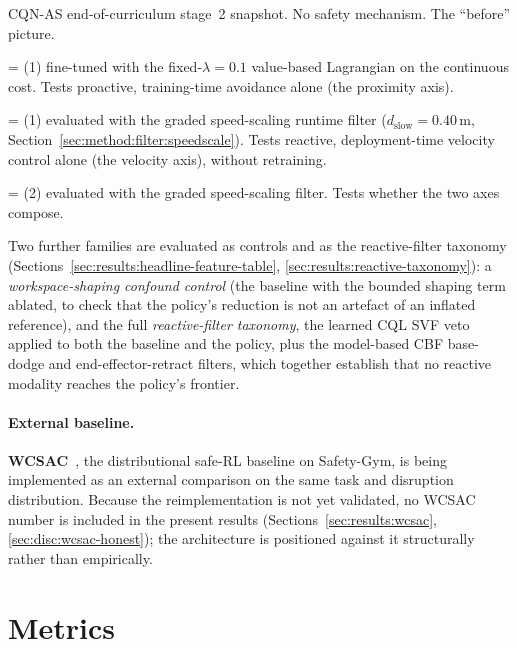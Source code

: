 \documentclass[11pt,a4paper]{report}
\newcommand{\cqnas}{CQN-AS}
\begin{document}
\begin{description}[leftmargin=2em,topsep=2pt,itemsep=1pt]
\item[(\textbf{1}) \emph{Unconstrained baseline}] \cqnas{}
  end-of-curriculum stage~2 snapshot. No safety mechanism. The
  ``before'' picture.
\item[(\textbf{2}) \emph{Proactive policy}] = (1) fine-tuned with the
  fixed-$\lambda = 0.1$ value-based Lagrangian on the continuous cost.
  Tests proactive, training-time avoidance alone (the proximity axis).
\item[(\textbf{3}) \emph{Speed-scaling filter on baseline}] = (1)
  evaluated with the graded speed-scaling runtime filter
  ($d_{\mathrm{slow}} = 0.40$\,m,
  Section~\ref{sec:method:filter:speedscale}). Tests reactive,
  deployment-time velocity control alone (the velocity axis), without
  retraining.
\item[(\textbf{4}) \emph{Composed hybrid}] = (2) evaluated with the
  graded speed-scaling filter. Tests whether the two axes compose.
\end{description}

Two further families are evaluated as controls and as the
reactive-filter taxonomy
(Sections~\ref{sec:results:headline-feature-table},
\ref{sec:results:reactive-taxonomy}): a \emph{workspace-shaping
confound control} (the baseline with the bounded shaping term ablated,
to check that the policy's reduction is not an artefact of an inflated
reference), and the full \emph{reactive-filter taxonomy}, the learned
\textsc{CQL} SVF veto applied to both the baseline and the policy, plus
the model-based CBF base-dodge and end-effector-retract filters, which
together establish that no reactive modality reaches the policy's
frontier.

\paragraph{External baseline.}
\textbf{WCSAC}~\cite{yang2021wcsac}, the distributional safe-RL
baseline on Safety-Gym, is being implemented as an external comparison
on the same task and disruption distribution. Because the
reimplementation is not yet validated, no WCSAC number is included in
the present results (Sections~\ref{sec:results:wcsac},
\ref{sec:disc:wcsac-honest}); the architecture is positioned against
it structurally rather than empirically.

\section{Metrics}
\label{sec:setup:metrics}
\end{document}
